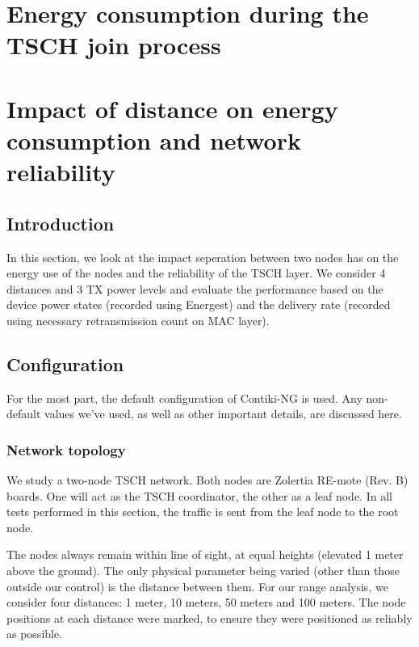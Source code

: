 \documentclass[conference]{IEEEtran}
\renewcommand\_{\textunderscore\allowbreak}
\begin{document}
\section{Energy consumption during the TSCH join process}
\label{section:task2}
%
%



\section{Impact of distance on energy consumption and network reliability}
\label{section:task3}
\subsection{Introduction}

In this section, we look at the impact seperation between two nodes has on the energy use of the nodes and the reliability of the TSCH layer. We consider 4 distances and 3 TX power levels and evaluate the performance based on the device power states (recorded using Energest) and the delivery rate (recorded using necessary retransmission count on MAC layer). 

\subsection{Configuration} 
For the most part, the default configuration of Contiki-NG is used. Any non-default values we've used, as well as other important details, are discussed here.

\subsubsection{Network topology}
We study a two-node TSCH network. Both nodes are Zolertia RE-mote (Rev. B) boards. One will act as the TSCH coordinator, the other as a leaf node. In all tests performed in this section, the traffic is sent from the leaf node to the root node. 

The nodes always remain within line of sight, at equal heights (elevated 1 meter above the ground). The only physical parameter being varied (other than those outside our control) is the distance between them. For our range analysis, we consider four distances: 1 meter, 10 meters, 50 meters and 100 meters. The node positions at each distance were marked, to ensure they were positioned as reliably as possible.
\end{document}
